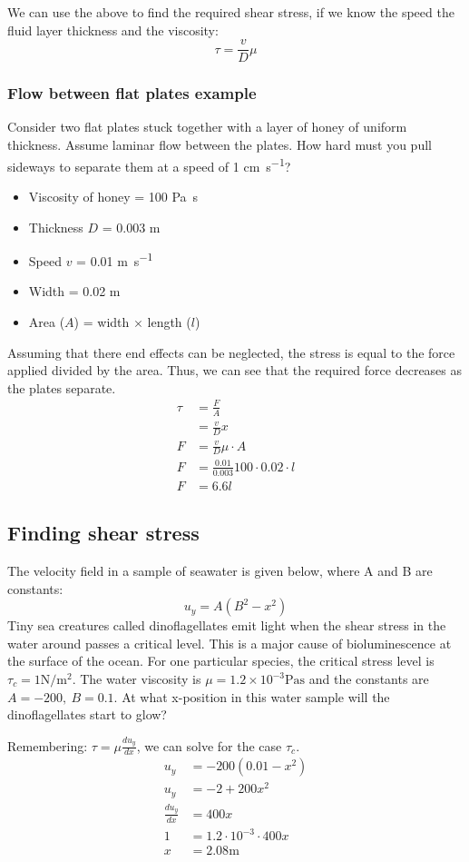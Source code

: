 \documentclass[class=report, crop=false, 12pt,a4paper]{standalone}
\begin{document}
We can use the above to find the required shear stress, if we know the speed the fluid layer thickness and the viscosity:
\[ \tau = \frac{v}{D}\mu \]
\subsubsection{Flow between flat plates example}
Consider two flat plates stuck together with a layer of honey of uniform thickness. Assume laminar flow between the plates. How hard must you pull sideways to separate them at a speed of 1 \si{\cm\per\second}?
\begin{itemize}[noitemsep]
  \item Viscosity of honey = 100 \si{\pascal \second}
  \item Thickness \(D\) = 0.003 \si{\meter}
  \item Speed \(v\) = 0.01 \si{\meter\per\second}
  \item Width = 0.02 \si{\meter}
  \item Area (\(A\)) = width \(\times\) length (\(l\))
\end{itemize}
Assuming that there end effects can be neglected, the stress is equal to the force applied divided by the area. Thus, we can see that the required force decreases as the plates separate.
\begin{align*}
  \tau &= \frac{F}{A}\\
  &= \frac{v}{D}x\\
  F &= \frac{v}{D}\mu \cdot A\\
  F &= \frac{0.01}{0.003}100 \cdot 0.02 \cdot l\\
  F &=6.6l
\end{align*}
\subsection{Finding shear stress}
The velocity field in a sample of seawater is given below, where A and B are constants:
\[ u_y = A(B^2-x^2) \]
Tiny sea creatures called dinoflagellates emit light when the shear stress in the water around passes a critical level. This is a major cause of bioluminescence at the surface of the ocean. For one particular species, the critical stress level is \(\tau_c = 1 \si{\newton\per\meter\squared}\). The water viscosity is \( \mu = 1.2 \times 10^{-3} \si{\pascal\second} \) and the constants are \(A = -200, \ B=0.1 \). At what x-position in this water sample will the dinoflagellates start to glow?

Remembering: \( \tau = \mu \frac{du_y}{dx} \), we can solve for the case \(\tau_c\).
\begin{align*}
  u_y &= -200(0.01-x^2)\\
  u_y &= -2 +200x^2\\
  \frac{du_y}{dx} &= 400x\\
  1 &= 1.2 \cdot 10^{-3} \cdot 400x\\
  x &= 2.08\si{\meter}
\end{align*}
\end{document}
